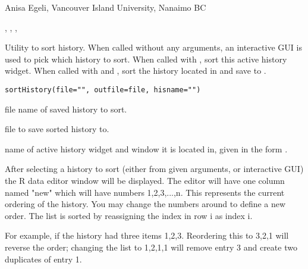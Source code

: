 \documentclass[letterpaper]{book}
\begin{document}
%
\begin{Author}\relax
Anisa Egeli, Vancouver Island University, Nanaimo BC
\end{Author}
%
\begin{SeeAlso}\relax
 
, , , 
\end{SeeAlso}
%
\begin{Description}\relax
Utility to sort history. When called without any arguments, an interactive GUI
is used to pick which history to sort. When called with , sort
this active history widget. When called with  and ,
sort the history located in  and save to .
\end{Description}
%
\begin{Usage}
\begin{verbatim}
sortHistory(file="", outfile=file, hisname="")
\end{verbatim}
\end{Usage}
%
\begin{Arguments}
\begin{ldescription}
\item[\code{file}] file name of saved history to sort.
\item[\code{outfile}] file to save sorted history to.
\item[\code{hisname}] name of active history widget and window it is located in, given
in the form .
\end{ldescription}
\end{Arguments}
%
\begin{Details}\relax
After selecting a history to sort (either from given arguments, or interactive GUI)
the R data editor window will be displayed. The editor will have one column named
\bsl{}"new\bsl{}" which will have numbers 1,2,3,...,n. This represents the current ordering
of the history. You may change the numbers around to define a new order. The list
is sorted by reassigning the index in row i as index i.

For example, if the history had three items 1,2,3. Reordering this to 3,2,1 will
reverse the order; changing the list to 1,2,1,1 will remove entry 3 and 
create two duplicates of entry 1.
\end{Details}
\end{document}
